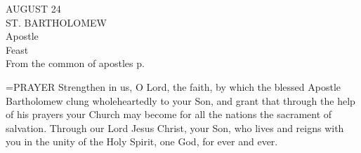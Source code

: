 \begin{center}\normalsize AUGUST 24\\
\footnotesize ST. BARTHOLOMEW\\
\footnotesize Apostle\\
\footnotesize Feast\\
\footnotesize From the common of apostles p. \\
\end{center}

\hangindent=\parindent \small{PRAYER 
Strengthen in us, O Lord, the faith,
by which the blessed Apostle Bartholomew
clung wholeheartedly to your Son,
and grant that through the help of his prayers
your Church may become for all the nations
the sacrament of salvation.
Through our Lord Jesus Christ, your Son,
who lives and reigns with you in the unity of the Holy Spirit,
one God, for ever and ever.\\}
 
